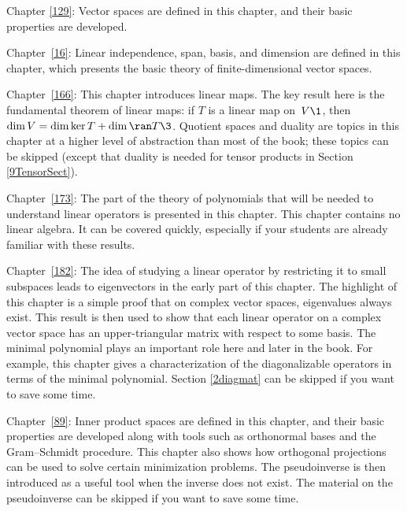 {
\setlength{\leftmargini}{.15in}

\begin{Itemize}
\item
Chapter \ref{129}: Vector spaces are defined in this chapter, and their basic properties are developed.

\item
Chapter~\ref{16}: Linear independence, span, basis, and dimension are defined in
this chapter, which presents the basic theory of finite-dimensional
vector spaces.

\item
Chapter~\ref{166}: This chapter introduces linear maps.  The key result
here is the fundamental theorem of linear maps: if $T$ is a linear map on~$V\1$, then
$\dim V = \dim \ker T + \dim \ran T\3$. Quotient spaces and duality are topics in this chapter at a higher level of abstraction than most of the book; these topics can be skipped (except that duality is needed for tensor products in Section \ref{9TensorSect}).

\item
Chapter~\ref{173}: The part of the theory of polynomials that will be needed to understand linear
operators is presented in this chapter. This chapter contains no linear algebra. It can be covered quickly, especially if your students are already familiar with these results.

\item
Chapter~\ref{182}: The idea of studying a linear operator by restricting it to small subspaces
leads to eigenvectors in the early part of this chapter.  The highlight of this chapter is a
simple  proof that on complex vector spaces, eigenvalues always exist.
This result is then used to show that each linear operator on a
complex vector space has an upper-triangular matrix with respect to
some basis. The minimal polynomial plays an important role here and later in the book. For example, this chapter gives a characterization of the diagonalizable operators in terms of the minimal polynomial.
Section \ref{2diagmat} can be skipped if you want to save some time.

\item
Chapter~\ref{89}: Inner product spaces are defined in this chapter, and their basic
properties are developed along with tools such as orthonormal bases and the Gram--Schmidt procedure. This chapter also shows
how orthogonal projections can be used to solve certain minimization problems. The pseudoinverse is then introduced as a useful tool when the inverse does not exist. The material on the pseudoinverse can be skipped if you want to save some time.


\end{Itemize}}
